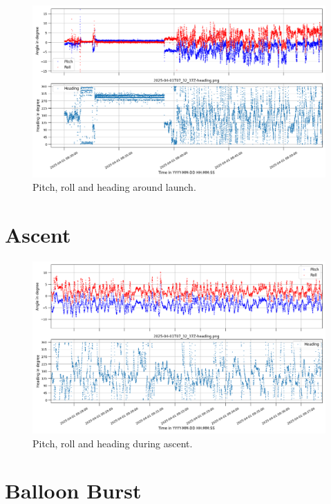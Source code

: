 \begin{figure}[H]
    \centering
    \includegraphics[width=\linewidth]{images/04_results/launch_heading.png}
    \caption[Heading at launch.]{Pitch, roll and heading around launch.}
    \label{fig:res:launch_angles}
\end{figure}


\section{Ascent \label{sec:ascent}}

\begin{figure}[H]
    \centering
    \includegraphics[width=\linewidth]{images/04_results/mid_flight_heading.png}
    \caption[Heading during ascent.]{Pitch, roll and heading during ascent.}
    \label{fig:res:ascent_angles}
\end{figure}


\section{Balloon Burst \label{sec:balloon_burst}}

